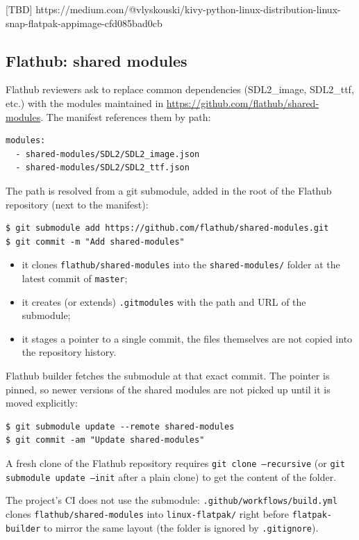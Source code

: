 
[TBD] https://medium.com/@vlyskouski/kivy-python-linux-distribution-linux-snap-flatpak-appimage-cfd085bad0cb

\subsection*{Flathub: shared modules}

Flathub reviewers ask to replace common dependencies (SDL2\_image, SDL2\_ttf, etc.) with the modules
maintained in \url{https://github.com/flathub/shared-modules}. The manifest references them by path:

\begin{lstlisting}
modules:
  - shared-modules/SDL2/SDL2_image.json
  - shared-modules/SDL2/SDL2_ttf.json
\end{lstlisting}

The path is resolved from a git submodule, added in the root of the Flathub repository (next to the manifest):

\begin{lstlisting}
$ git submodule add https://github.com/flathub/shared-modules.git
$ git commit -m "Add shared-modules"
\end{lstlisting}

\begin{itemize}
  \item it clones \texttt{flathub/shared-modules} into the \texttt{shared-modules/} folder at the latest commit of \texttt{master};
  \item it creates (or extends) \texttt{.gitmodules} with the path and URL of the submodule;
  \item it stages a pointer to a single commit, the files themselves are not copied into the repository history.
\end{itemize}

Flathub builder fetches the submodule at that exact commit. The pointer is pinned, so newer versions of
the shared modules are not picked up until it is moved explicitly:

\begin{lstlisting}
$ git submodule update --remote shared-modules
$ git commit -am "Update shared-modules"
\end{lstlisting}

A fresh clone of the Flathub repository requires \texttt{git clone --recursive}
(or \texttt{git submodule update --init} after a plain clone) to get the content of the folder.

The project's CI does not use the submodule: \texttt{.github/workflows/build.yml} clones
\texttt{flathub/shared-modules} into \texttt{linux-flatpak/} right before \texttt{flatpak-builder}
to mirror the same layout (the folder is ignored by \texttt{.gitignore}).
